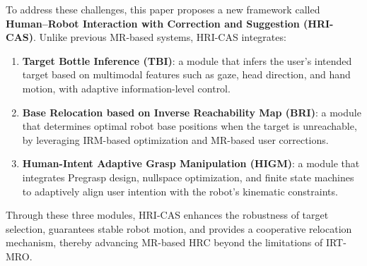 \documentclass[../../main.tex]{subfiles} %
\begin{document}
To address these challenges, this paper proposes a new framework called \textbf{Human–Robot Interaction with Correction and Suggestion (HRI-CAS)}.  
Unlike previous MR-based systems, HRI-CAS integrates:  
\begin{enumerate}
  \item \textbf{Target Bottle Inference (TBI)}: a module that infers the user’s 
  intended target based on multimodal features such as gaze, 
  head direction, and hand motion, with adaptive information-level control.
  \item \textbf{Base Relocation based on Inverse Reachability Map (BRI)}: 
  a module that determines optimal robot base positions when the target is unreachable, 
  by leveraging IRM-based optimization and MR-based user corrections.
  \item \textbf{Human-Intent Adaptive Grasp Manipulation (HIGM)}: a module that integrates Pregrasp design, nullspace optimization, 
  and finite state machines to adaptively align user intention with the robot’s kinematic constraints.
\end{enumerate}

Through these three modules, HRI-CAS enhances the robustness of target selection, 
guarantees stable robot motion, and provides a cooperative relocation mechanism, 
thereby advancing MR-based HRC beyond the limitations of IRT-MRO.
\end{document}
